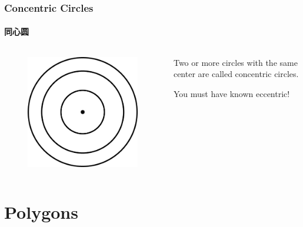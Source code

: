 \documentclass[
	11pt, %
]{beamer}
\begin{document}

\begin{frame}
\frametitle{Concentric Circles}
\framesubtitle{同心圆}

\begin{columns}[t] 
		\begin{column}{0.4\textwidth} %
			\begin{figure}
				\includegraphics[width=\linewidth]{Concentric.jpg}
			\end{figure}
		\end{column}
		\begin{column}{0.6\textwidth} %
		\begin{definition}
Two or more circles with the same center are called concentric circles.		
\end{definition}
\pause You must have known eccentric!
		\end{column}
	\end{columns}
\end{frame}


\section{Polygons}
\end{document}
